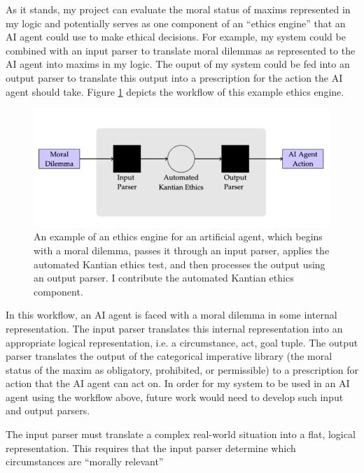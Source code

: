\begin{isabellebody}
\begin{isamarkuptext}
As it stands, my project can evaluate the moral status of maxims represented in my logic and potentially 
serves as one component of an ``ethics engine'' that an AI agent could use to make ethical decisions.
For example, my system could be combined with an input parser to translate moral dilemmas as represented 
to the AI agent into maxims in my logic. The ouput of my system could be fed into an output 
parser to translate this output into a prescription for the action the AI agent should take.
Figure \ref{fig:AIengine} depicts the workflow of this example ethics engine.%
\end{isamarkuptext}\isamarkuptrue%
%
\begin{figure}
\centering
\includegraphics[scale=0.4]{AI_engine.png}
\caption{An example of an ethics engine for an artificial agent, which begins with a moral dilemma, 
passes it through an input parser, applies the automated Kantian ethics test, and then processes the 
output using an output parser. I contribute the automated Kantian ethics component.} \label{fig:AIengine}
\end{figure}
%
\begin{isamarkuptext}%
In this workflow, an AI agent is faced with a moral dilemma in some internal representation. The input
parser translates this internal representation into an appropriate logical representation, i.e. 
a circumstance, act, goal tuple. The output parser translates the output of the categorical imperative
library (the moral status of the maxim as obligatory, prohibited, or permissible) to a prescription for
action that the AI agent can act on. In order for my system to be used in an AI agent using the workflow
above, future work would need to develop such input and output parsers.%
\end{isamarkuptext}\isamarkuptrue%
%
\begin{isamarkuptext}%
The input parser must translate a complex real-world situation into a flat, logical representation. 
This requires that the input parser determine which circumstances are ``morally relevant''

\end{isamarkuptext}
\end{isabellebody}

